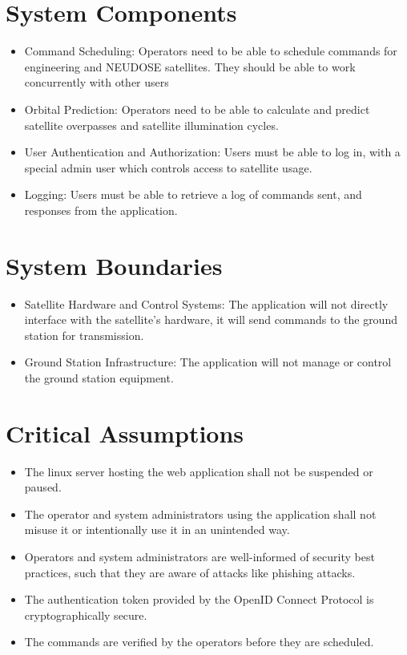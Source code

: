 \documentclass{article}
\begin{document}
\section{System Components}
\begin{itemize}
    \item Command Scheduling: 
Operators need to be able to schedule commands for engineering and NEUDOSE satellites. They should be able to work concurrently with other users

\item Orbital Prediction:
Operators need to be able to calculate and predict satellite overpasses and satellite illumination cycles.
 \item User Authentication and Authorization: 
Users must be able to log in, with a special admin user which controls access to satellite usage.


\item Logging:
Users must be able to retrieve a log of commands sent, and responses from the application.

\end{itemize}

\section{System Boundaries}
\begin{itemize}
    \item Satellite Hardware and Control Systems:
The application will not directly interface with the satellite’s hardware, it will send commands to the ground station for transmission.

\item Ground Station Infrastructure:
The application will not manage or control the ground station equipment.

\end{itemize}

\section{Critical Assumptions}

\begin{itemize}
\item The linux server hosting the web application shall not be suspended or paused.
\item The operator and system administrators using the application shall not misuse it or intentionally use it in an unintended way.
\item Operators and system administrators are well-informed of security best practices, such that they are aware of attacks like phishing attacks.
\item The authentication token provided by the OpenID Connect Protocol is cryptographically secure.
\item The commands are verified by the operators before they are scheduled.
\end{itemize}
\end{document}
